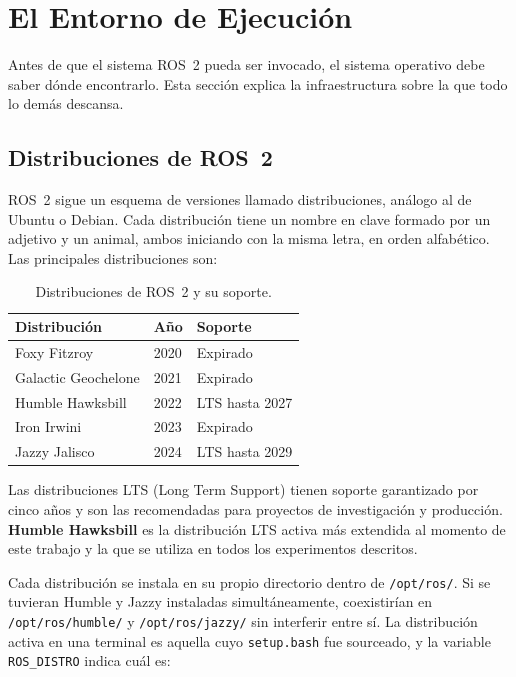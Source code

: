 \section{El Entorno de Ejecución}

Antes de que el sistema ROS~2 pueda ser invocado, el sistema operativo debe saber dónde encontrarlo. Esta sección explica la infraestructura sobre la que todo lo demás descansa.

\subsection{Distribuciones de ROS~2}

ROS~2 sigue un esquema de versiones llamado distribuciones, análogo al de Ubuntu o Debian. Cada distribución tiene un nombre en clave formado por un adjetivo y un animal, ambos iniciando con la misma letra, en orden alfabético. Las principales distribuciones son:

\begin{table}[H]
  \centering
  \caption{Distribuciones de ROS~2 y su soporte.}
  \label{tab:distros}
  \begin{tabular}{lll}
    \toprule
    Distribución & Año & Soporte \\
    \midrule
    Foxy Fitzroy        & 2020 & Expirado \\
    Galactic Geochelone & 2021 & Expirado \\
    Humble Hawksbill    & 2022 & LTS hasta 2027 \\
    Iron Irwini         & 2023 & Expirado \\
    Jazzy Jalisco       & 2024 & LTS hasta 2029 \\
    \bottomrule
  \end{tabular}
\end{table}

Las distribuciones LTS (Long Term Support) tienen soporte garantizado por cinco años y son las recomendadas para proyectos de investigación y producción. \textbf{Humble Hawksbill} es la distribución LTS activa más extendida al momento de este trabajo y la que se utiliza en todos los experimentos descritos.

Cada distribución se instala en su propio directorio dentro de \texttt{/opt/ros/}. Si se tuvieran Humble y Jazzy instaladas simultáneamente, coexistirían en \texttt{/opt/ros/humble/} y \texttt{/opt/ros/jazzy/} sin interferir entre sí. La distribución activa en una terminal es aquella cuyo \texttt{setup.bash} fue sourceado, y la variable \texttt{ROS\_DISTRO} indica cuál es:

